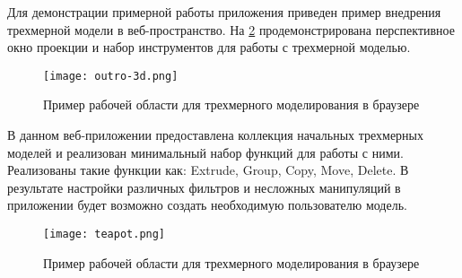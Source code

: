 Для демонстрации примерной работы приложения приведен пример внедрения трехмерной модели в веб-пространство. На \ref{figure:outro:3d} продемонстрирована перспективное окно проекции 
и набор инструментов для работы с трехмерной моделью.

\begin{figure}[ht]
    \centering
      \texttt{[image: outro-3d.png]}
      \caption{Пример рабочей области для трехмерного моделирования в браузере}
      \label{figure:outro:3d}
\end{figure}
 
В данном веб-приложении предоставлена коллекция начальных трехмерных моделей и реализован минимальный набор функций для работы с ними. Реализованы 
такие функции как: Extrude, Group, Copy, Move, Delete. В результате настройки различных фильтров и несложных манипуляций в приложении будет возможно создать необходимую пользователю модель.

\begin{figure}[ht]
    \centering
      \texttt{[image: teapot.png]}
      \caption{Пример рабочей области для трехмерного моделирования в браузере}
      \label{figure:outro:3d}
\end{figure}